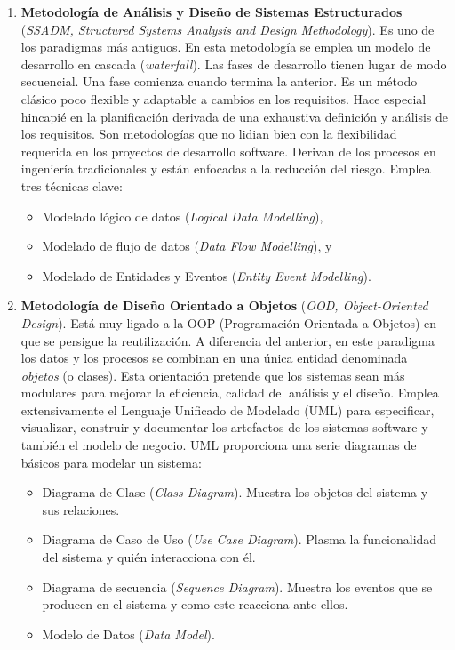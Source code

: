 \begin{enumerate}
\item \textbf{Metodología de Análisis y Diseño de Sistemas Estructurados} 
(\emph{SSADM, Structured Systems Analysis and Design 
Methodology}). Es uno de los paradigmas más antiguos. En esta 
metodología se emplea un modelo de desarrollo en cascada 
(\emph{waterfall}). Las fases de 
desarrollo tienen lugar de modo secuencial. Una fase comienza cuando termina 
la anterior. Es un método clásico poco flexible y adaptable a cambios en los 
requisitos. Hace especial hincapié en la planificación derivada de una 
exhaustiva definición y análisis de los requisitos. Son metodologías que no 
lidian bien con la flexibilidad requerida en los proyectos de desarrollo 
software. Derivan de los procesos en  ingeniería tradicionales y están 
enfocadas a la reducción del riesgo. Emplea tres técnicas clave:

\begin{itemize}
\item Modelado lógico de datos (\emph{Logical Data 
Modelling}),
\item Modelado de flujo de datos (\emph{Data Flow Modelling}), y
\item Modelado de Entidades y Eventos (\emph{Entity Event
  Modelling}).
\end{itemize} 

\item \textbf{Metodología de Diseño Orientado a Objetos} (\emph{OOD,  
Object-Oriented Design}). Está muy ligado a la OOP (Programación 
Orientada a Objetos) en que se persigue la reutilización. A diferencia del 
anterior, en este paradigma los datos y los procesos se combinan en una única 
entidad denominada \emph{objetos} (o clases). Esta orientación pretende que 
los sistemas sean más modulares para mejorar la eficiencia, calidad del 
análisis y el diseño. Emplea extensivamente el Lenguaje Unificado de Modelado 
(UML) para especificar, visualizar, construir y documentar los 
artefactos de los sistemas software y  también el modelo de negocio. UML 
proporciona una serie diagramas de básicos para modelar un sistema: 

\begin{itemize}
\item Diagrama de Clase (\emph{Class Diagram}). Muestra los objetos del sistema y sus relaciones. 
\item Diagrama de Caso de Uso (\emph{Use Case Diagram}). Plasma la
  funcionalidad del sistema y quién interacciona con él.
\item Diagrama de secuencia (\emph{Sequence Diagram}). Muestra los eventos que se
  producen en el sistema y como este reacciona ante ellos. 
\item Modelo de Datos (\emph{Data Model}).
\end{itemize} 
                               

\end{enumerate}

